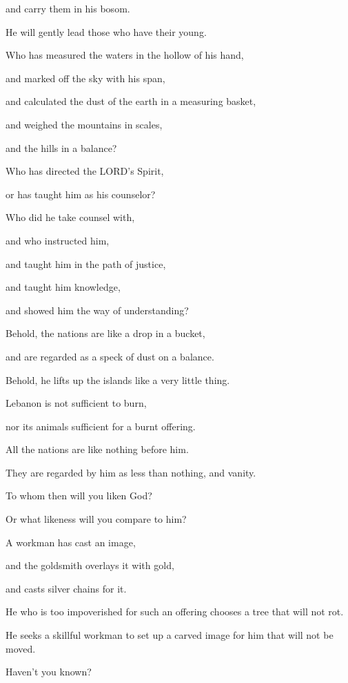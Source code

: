 and carry them in his bosom.

He will gently lead those who have their young.


\vspace{\baselineskip} \myverse{}Who has measured the waters in the hollow of his hand,

and marked off the sky with his span,

and calculated the dust of the earth in a measuring basket,

and weighed the mountains in scales,

and the hills in a balance?

\myverse{}Who has directed the LORD’s Spirit,

or has taught him as his counselor?

\myverse{}Who did he take counsel with,

and who instructed him,

and taught him in the path of justice,

and taught him knowledge,

and showed him the way of understanding?

\myverse{}Behold, the nations are like a drop in a bucket,

and are regarded as a speck of dust on a balance.

Behold, he lifts up the islands like a very little thing.

\myverse{}Lebanon is not sufficient to burn,

nor its animals sufficient for a burnt offering.

\myverse{}All the nations are like nothing before him.

They are regarded by him as less than nothing, and vanity.


\vspace{\baselineskip} \myverse{}To whom then will you liken God?

Or what likeness will you compare to him?

\myverse{}A workman has cast an image,

and the goldsmith overlays it with gold,

and casts silver chains for it.

\myverse{}He who is too impoverished for such an offering chooses a tree
that will not rot.

He seeks a skillful workman to set up a carved image for him that will not be
moved.


\vspace{\baselineskip} \myverse{}Haven’t you known?

